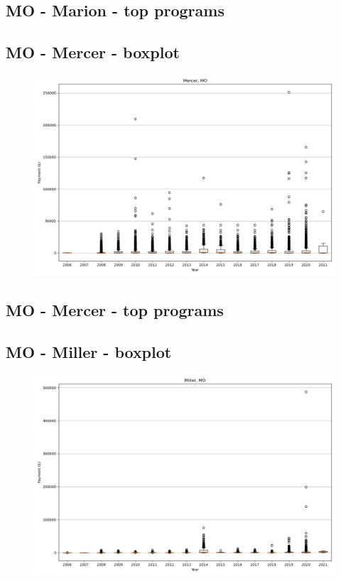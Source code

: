 \subsection*{MO - Marion - top programs}

\newpage
\subsection*{MO - Mercer - boxplot}
\begin{figure}[h]
\centering
\includegraphics[width=7in]{../output/boxplots/counties/Mercer-MO_boxplot.png}
\end{figure}


\subsection*{MO - Mercer - top programs}

\newpage
\subsection*{MO - Miller - boxplot}
\begin{figure}[h]
\centering
\includegraphics[width=7in]{../output/boxplots/counties/Miller-MO_boxplot.png}
\end{figure}


